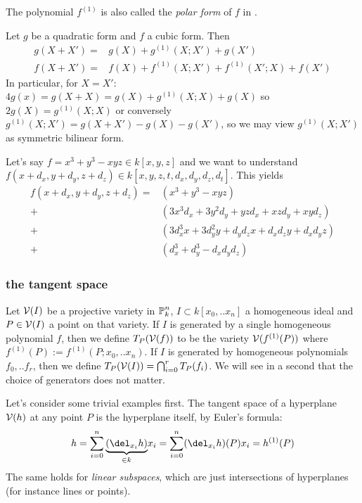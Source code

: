 \begin{remark}
The polynomial $f^{(1)}$ is also called the \emph{polar form} of $f$ in \cite[p. 104]{reid1988undergraduate}.
\end{remark}

\begin{corollary} \label{corollaryTaylorForQuadricAndCubic}
Let $g$ be a quadratic form and $f$ a cubic form. Then
\begin{align}
g(X+X') =& g(X) + g^{(1)}(X;X') + g(X')
\\ f(X+X') =& f(X) + f^{(1)}(X;X') + f^{(1)}(X';X) + f(X')
\end{align}
In particular, for $X=X'$: $4g(x) = g(X+X) = g(X) + g^{(1)}(X;X) + g(X)$ so $2g(X) = g^{(1)}(X;X)$ or conversely $g^{(1)}(X;X') = g(X+X') - g(X) - g(X')$, so we may view $g^{(1)}(X;X')$ as symmetric bilinear form.
\end{corollary}

\begin{example}
Let's say $f = x^3 + y^3 - xyz \in k[x,y,z]$ and we want to understand $f(x+d_x,y+d_y,z+d_z) \in k[x,y,z,t,d_x,d_y,d_z,d_t]$.
This yields
\begin{align*}
f(x+d_x,y+d_y,z+d_z)
  =& (x^3 + y^3 - xyz)
\\+& (3x^3d_x + 3y^2d_y + yzd_x + xzd_y + xyd_z)
\\+& (3d_x^3x + 3d_y^2y + d_yd_zx + d_xd_zy+d_xd_yz)
\\+& (d_x^3 + d_y^3 - d_xd_yd_z)
\end{align*}
\end{example}


\subsubsection{the tangent space}

\begin{definition} \label{definitionTangentSpace}
Let $\operatorname{\mathcal V}(I)$ be a projective variety in $\operatorname{\mathbb P}^n_k$, $I \subset k[x_0,..x_n]$ a homogeneous ideal and $P\in \operatorname{\mathcal V}(I)$ a point on that variety.
If $I$ is generated by a single homogeneous polynomial $f$, then we define $T_P(\operatorname{\mathcal V}(f))$ to be the variety $\operatorname{\mathcal V}(f^{(1)}(P))$ where $f^{(1)}(P) := f^{(1)}(P;x_0,..x_n)$.
If $I$ is generated by homogeneous polynomials $f_0,..f_r$, then we define $T_P(\operatorname{\mathcal V}(I)) = \bigcap_{i=0}^r T_P(f_i)$.
We will see in a second that the choice of generators does not matter.
\end{definition}

\begin{example} \label{exampleTangentPlaneOfLinearSubsets}
Let's consider some trivial examples first.
The tangent space of a hyperplane $\operatorname{\mathcal V}(h)$ at any point $P$ is the hyperplane itself, by Euler's formula:
\begin{equation}
h = \sum_{i=0}^n \underset{\in k}{\underbrace{(\del_{x_i}h)}}x_i = \sum_{i=0}^n (\del_{x_i}h)(P) x_i = h^{(1)}(P)
\end{equation}
The same holds for \emph{linear subspaces}, which are just intersections of hyperplanes (for instance lines or points).
\end{example}

